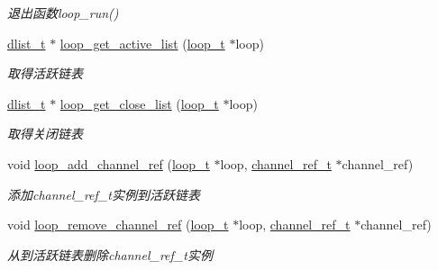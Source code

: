 \begin{DoxyCompactItemize}
\begin{DoxyCompactList}\small\item\em 退出函数loop\+\_\+run() \end{DoxyCompactList}\item 
\hyperlink{a00047_ad6644d67df4b4e3596c1eb12977d1d16_ad6644d67df4b4e3596c1eb12977d1d16}{dlist\+\_\+t} $\ast$ \hyperlink{a00062_a7c1a2360919bfff72d665f2651a8d080_a7c1a2360919bfff72d665f2651a8d080}{loop\+\_\+get\+\_\+active\+\_\+list} (\hyperlink{a00047_a9c3ad1cd2de83e09f3a7b59fa82c94ee_a9c3ad1cd2de83e09f3a7b59fa82c94ee}{loop\+\_\+t} $\ast$loop)
\begin{DoxyCompactList}\small\item\em 取得活跃链表 \end{DoxyCompactList}\item 
\hyperlink{a00047_ad6644d67df4b4e3596c1eb12977d1d16_ad6644d67df4b4e3596c1eb12977d1d16}{dlist\+\_\+t} $\ast$ \hyperlink{a00062_a282fa587372c0abd536f46a396cd41d4_a282fa587372c0abd536f46a396cd41d4}{loop\+\_\+get\+\_\+close\+\_\+list} (\hyperlink{a00047_a9c3ad1cd2de83e09f3a7b59fa82c94ee_a9c3ad1cd2de83e09f3a7b59fa82c94ee}{loop\+\_\+t} $\ast$loop)
\begin{DoxyCompactList}\small\item\em 取得关闭链表 \end{DoxyCompactList}\item 
void \hyperlink{a00062_ab4f4cfdde0b598a3e8267a5ff60775ec_ab4f4cfdde0b598a3e8267a5ff60775ec}{loop\+\_\+add\+\_\+channel\+\_\+ref} (\hyperlink{a00047_a9c3ad1cd2de83e09f3a7b59fa82c94ee_a9c3ad1cd2de83e09f3a7b59fa82c94ee}{loop\+\_\+t} $\ast$loop, \hyperlink{a00047_a151271c9d188ef28d4d24bb81dcc1263_a151271c9d188ef28d4d24bb81dcc1263}{channel\+\_\+ref\+\_\+t} $\ast$channel\+\_\+ref)
\begin{DoxyCompactList}\small\item\em 添加channel\+\_\+ref\+\_\+t实例到活跃链表 \end{DoxyCompactList}\item 
void \hyperlink{a00062_a074c9c3a80a8a5c57b831e41395d4ef5_a074c9c3a80a8a5c57b831e41395d4ef5}{loop\+\_\+remove\+\_\+channel\+\_\+ref} (\hyperlink{a00047_a9c3ad1cd2de83e09f3a7b59fa82c94ee_a9c3ad1cd2de83e09f3a7b59fa82c94ee}{loop\+\_\+t} $\ast$loop, \hyperlink{a00047_a151271c9d188ef28d4d24bb81dcc1263_a151271c9d188ef28d4d24bb81dcc1263}{channel\+\_\+ref\+\_\+t} $\ast$channel\+\_\+ref)
\begin{DoxyCompactList}\small\item\em 从到活跃链表删除channel\+\_\+ref\+\_\+t实例 \end{DoxyCompactList}\item 

\end{DoxyCompactItemize}
